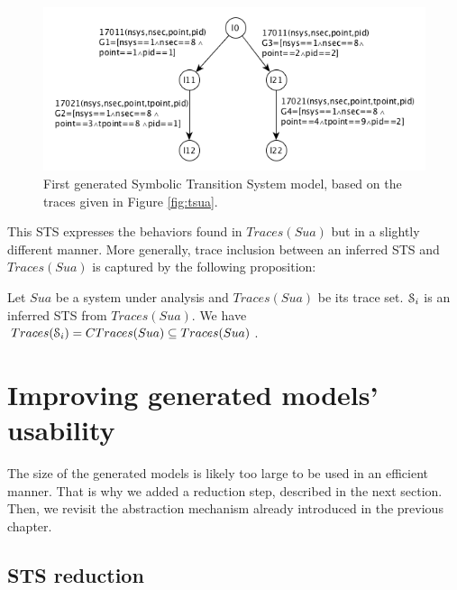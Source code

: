 \begin{figure}[ht]
  \includegraphics[width=1.0\linewidth]{figures/STS1.png}

  \caption{First generated Symbolic Transition System model,
  based on the traces given in Figure \ref{fig:tsua}.}
  \label{fig:firstmodel}
\end{figure}

This STS expresses the behaviors found in $Traces(Sua)$ but in a
slightly different manner. More generally, trace inclusion
between an inferred STS and $Traces(Sua)$ is captured by the
following proposition:

\begin{proposition}
  Let $\mathit{Sua}$ be a system under analysis and $Traces(Sua)$ be its
  trace set. $\EuScript{S}_i$ is an inferred STS from
  $Traces(Sua)$.
  We have $Traces(\EuScript{S}_i) = CTraces(Sua) \subseteq Traces(Sua)$.

	\label{def:equivtraces_IOSTS}
\end{proposition}



\section{Improving generated models' usability}
\label{sec:modelinf:usability}

The size of the generated models is likely too large to be used
in an efficient manner. That is why we added a reduction step,
described in the next section. Then, we revisit the abstraction
mechanism already introduced in the previous chapter.

\subsection{STS reduction}
\label{sec:modelinf:prodsystems:reduction}

